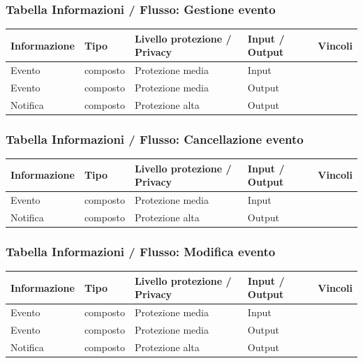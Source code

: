 \documentclass[12pt,a4paper]{report}
\begin{document}
\subsubsection{Tabella Informazioni / Flusso: Gestione evento}
\begin{tabularx}{\textwidth}{|X|X|X|X|X|}
    \hline
    \rowcolor{studyColor} \textbf{Informazione} & \textbf{Tipo} & \textbf{Livello protezione / Privacy} & \textbf{Input / Output} & \textbf{Vincoli} \\ \hline
    \endhead
    Evento & composto & Protezione media & Input & \\ \hline
    Evento & composto & Protezione media & Output & \\ \hline
    Notifica & composto & Protezione alta & Output & \\ \hline
\end{tabularx}

\subsubsection{Tabella Informazioni / Flusso: Cancellazione evento}
\begin{tabularx}{\textwidth}{|X|X|X|X|X|}
    \hline
    \rowcolor{studyColor} \textbf{Informazione} & \textbf{Tipo} & \textbf{Livello protezione / Privacy} & \textbf{Input / Output} & \textbf{Vincoli} \\ \hline
    \endhead
    Evento & composto & Protezione media & Input & \\ \hline
    Notifica & composto & Protezione alta & Output & \\ \hline
\end{tabularx}

\subsubsection{Tabella Informazioni / Flusso: Modifica evento}
\begin{tabularx}{\textwidth}{|X|X|X|X|X|}
    \hline
    \rowcolor{studyColor} \textbf{Informazione} & \textbf{Tipo} & \textbf{Livello protezione / Privacy} & \textbf{Input / Output} & \textbf{Vincoli} \\ \hline
    \endhead
    Evento & composto & Protezione media & Input & \\ \hline
    Evento & composto & Protezione media & Output & \\ \hline
    Notifica & composto & Protezione alta & Output & \\ \hline
\end{tabularx}
\end{document}
